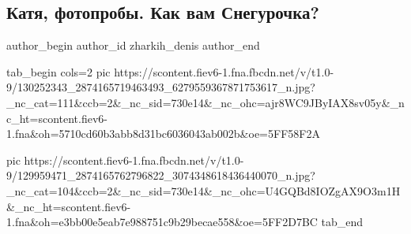  
 
 
 
 
 
\subsection{Катя, фотопробы. Как вам Снегурочка?}
\label{sec:07_12_2020.fb.zharkih_denis.3.katja_zharkih_snegurochka}
\ifcmt
	author_begin
   author_id zharkih_denis
	author_end
\fi

\ifcmt
tab_begin cols=2
pic https://scontent.fiev6-1.fna.fbcdn.net/v/t1.0-9/130252343_2874165719463493_6279559367871753617_n.jpg?_nc_cat=111&ccb=2&_nc_sid=730e14&_nc_ohc=ajr8WC9JByIAX8sv05y&_nc_ht=scontent.fiev6-1.fna&oh=5710cd60b3abb8d31bc6036043ab002b&oe=5FF58F2A

pic https://scontent.fiev6-1.fna.fbcdn.net/v/t1.0-9/129959471_2874165762796822_3074348618436440070_n.jpg?_nc_cat=104&ccb=2&_nc_sid=730e14&_nc_ohc=U4GQBd8IOZgAX9O3m1H&_nc_ht=scontent.fiev6-1.fna&oh=e3bb00e5eab7e988751c9b29becae558&oe=5FF2D7BC
tab_end
\fi
